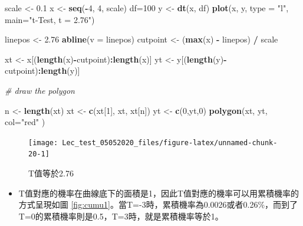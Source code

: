 \documentclass[hyperref,]{ctexart}
\newenvironment{Shaded}{\begin{snugshade}}{\end{snugshade}}
\newcommand{\CommentTok}[1]{\textcolor[rgb]{0.56,0.35,0.01}{\textit{#1}}}
\newcommand{\DataTypeTok}[1]{\textcolor[rgb]{0.13,0.29,0.53}{#1}}
\newcommand{\DecValTok}[1]{\textcolor[rgb]{0.00,0.00,0.81}{#1}}
\newcommand{\FloatTok}[1]{\textcolor[rgb]{0.00,0.00,0.81}{#1}}
\newcommand{\KeywordTok}[1]{\textcolor[rgb]{0.13,0.29,0.53}{\textbf{#1}}}
\newcommand{\NormalTok}[1]{#1}
\newcommand{\OperatorTok}[1]{\textcolor[rgb]{0.81,0.36,0.00}{\textbf{#1}}}
\newcommand{\StringTok}[1]{\textcolor[rgb]{0.31,0.60,0.02}{#1}}
\providecommand{\tightlist}{%
  \setlength{\itemsep}{0pt}\setlength{\parskip}{0pt}}
\begin{document}
\begin{Shaded}
\begin{Highlighting}[]
\NormalTok{scale <-}\StringTok{ }\FloatTok{0.1} 
\NormalTok{x <-}\StringTok{ }\KeywordTok{seq}\NormalTok{(}\OperatorTok{-}\DecValTok{4}\NormalTok{, }\DecValTok{4}\NormalTok{, scale) }
\NormalTok{df=}\DecValTok{100}
\NormalTok{y <-}\StringTok{ }\KeywordTok{dt}\NormalTok{(x, df) }
\KeywordTok{plot}\NormalTok{(x, y, }\DataTypeTok{type =} \StringTok{"l"}\NormalTok{, }\DataTypeTok{main=}\StringTok{"t-Test, t = 2.76"}\NormalTok{) }

\NormalTok{linepos <-}\StringTok{ }\FloatTok{2.76} 
\KeywordTok{abline}\NormalTok{(}\DataTypeTok{v =}\NormalTok{ linepos) }
\NormalTok{cutpoint <-}\StringTok{ }\NormalTok{(}\KeywordTok{max}\NormalTok{(x) }\OperatorTok{-}\StringTok{ }\NormalTok{linepos) }\OperatorTok{/}\StringTok{ }\NormalTok{scale }

\NormalTok{xt <-}\StringTok{ }\NormalTok{x[(}\KeywordTok{length}\NormalTok{(x)}\OperatorTok{-}\NormalTok{cutpoint)}\OperatorTok{:}\KeywordTok{length}\NormalTok{(x)] }
\NormalTok{yt <-}\StringTok{ }\NormalTok{y[(}\KeywordTok{length}\NormalTok{(y)}\OperatorTok{-}\NormalTok{cutpoint)}\OperatorTok{:}\KeywordTok{length}\NormalTok{(y)] }

\CommentTok{# draw the polygon }

\NormalTok{n <-}\StringTok{ }\KeywordTok{length}\NormalTok{(xt) }
\NormalTok{xt <-}\StringTok{ }\KeywordTok{c}\NormalTok{(xt[}\DecValTok{1}\NormalTok{], xt, xt[n]) }
\NormalTok{yt <-}\StringTok{ }\KeywordTok{c}\NormalTok{(}\DecValTok{0}\NormalTok{,yt,}\DecValTok{0}\NormalTok{) }
\KeywordTok{polygon}\NormalTok{(xt, yt, }\DataTypeTok{col=}\StringTok{"red"}\NormalTok{ ) }
\end{Highlighting}
\end{Shaded}

\begin{figure}

\texttt{[image: Lec\_test\_05052020\_files/figure-latex/unnamed-chunk-20-1]} \hfill{}

\caption{\label{fig:tvaluesmall}T值等於2.76}\label{fig:unnamed-chunk-20}
\end{figure}

\begin{itemize}
\tightlist
\item
  T值對應的機率在曲線底下的面積是1，因此T值對應的機率可以用累積機率的方式呈現如圖
  \ref{fig:cumu1}。當T=-3時，累積機率為0.0026或者0.26\%，而到了T=0的累積機率則是0.5，T=3時，就是累積機率等於1。
\end{itemize}
\end{document}
